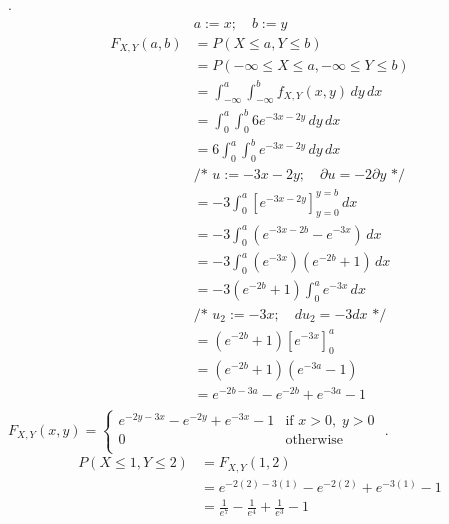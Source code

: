 \documentclass[12pt,border=4pt,multi]{article} %
\begin{document}
\newpage
{}.
\begin{align*}
&a := x; \quad b := y\\
F_{X, Y}(a, b) &= P(X \leq a, Y \leq b)\\
&= P(-\infty \leq X \leq a, -\infty \leq Y \leq b)\\
&= \int_{-\infty}^{a} \int_{-\infty}^{b} f_{X, Y}(x, y)\,dy\,dx\\
&= \int_{0}^{a} \int_{0}^{b} 6e^{-3x - 2y}\,dy\,dx\\
&= 6\int_{0}^{a} \int_{0}^{b} e^{-3x - 2y}\,dy\,dx\\
&\text{/* } u := -3x - 2y;\quad \partial u = -2 \partial y \text{ */}\\
&= -3\int_{0}^{a} [e^{-3x - 2y}]_{y = 0}^{y = b}\,dx\\ 
&= -3\int_{0}^{a} (e^{-3x - 2b} - e^{-3x})\,dx\\ 
&= -3\int_{0}^{a} (e^{-3x})(e^{-2b} + 1)\,dx\\
&= -3(e^{-2b} + 1)\int_{0}^{a} e^{-3x}\,dx\\
&\text{/* } u_2 := -3x;\quad du_2 = -3dx \text{ */}\\
&= (e^{-2b} + 1) [e^{-3x}]_0^a\\
&= (e^{-2b} + 1)(e^{-3a} - 1)\\
&= e^{-2b - 3a} - e^{-2b} + e^{-3a} - 1\\
\end{align*}
$\boxed{F_{X, Y}(x, y) =
\begin{cases}
e^{-2y - 3x} - e^{-2y} + e^{-3x} - 1 & \text{if } x > 0,\; y > 0\\
0 & \text{otherwise}\\
\end{cases}}$
\newpage
{}.
\begin{align*}
P(X \leq 1, Y \leq 2) &= F_{X, Y}(1, 2)\\
&= e^{-2(2) - 3(1)} - e^{-2(2)} + e^{-3(1)} - 1\\
&= \boxed{\frac{1}{e^{7}} - \frac{1}{e^{4}} + \frac{1}{e^{3}} - 1}\\
\end{align*}
\end{document}
